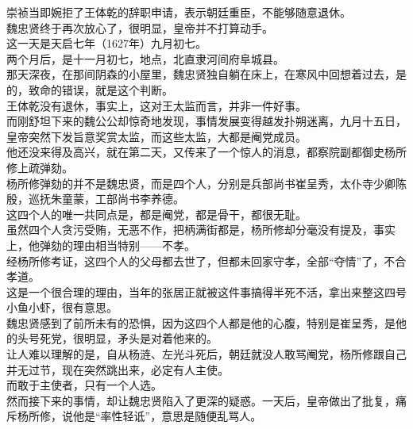 \begin{multicols}{\theparacolNo}
崇祯当即婉拒了王体乾的辞职申请，表示朝廷重臣，不能够随意退休。\\

魏忠贤终于再次放心了，很明显，皇帝并不打算动手。\\

这一天是天启七年（1627年）九月初七。\\

两个月后，是十一月初七，地点，北直隶河间府阜城县。\\

那天深夜，在那间阴森的小屋里，魏忠贤独自躺在床上，在寒风中回想着过去，是的，致命的错误，就是这个判断。\\

王体乾没有退休，事实上，这对王太监而言，并非一件好事。\\

而刚舒坦下来的魏公公却惊奇地发现，事情发展变得越发扑朔迷离，九月十五日，皇帝突然下发旨意奖赏太监，而这些太监，大都是阉党成员。\\

他还没来得及高兴，就在第二天，又传来了一个惊人的消息，都察院副都御史杨所修上疏弹劾。\\

杨所修弹劾的并不是魏忠贤，而是四个人，分别是兵部尚书崔呈秀，太仆寺少卿陈殷，巡抚朱童蒙，工部尚书李养德。\\

这四个人的唯一共同点是，都是阉党，都是骨干，都很无耻。\\

虽然四个人贪污受贿，无恶不作，把柄满街都是，杨所修却分毫没有提及，事实上，他弹劾的理由相当特别——不孝。\\

经杨所修考证，这四个人的父母都去世了，但都未回家守孝，全部“夺情”了，不合孝道。\\

这是一个很合理的理由，当年的张居正就被这件事搞得半死不活，拿出来整这四号小鱼小虾，很有意思。\\

魏忠贤感到了前所未有的恐惧，因为这四个人都是他的心腹，特别是崔呈秀，是他的头号死党，很明显，矛头是对着他来的。\\

让人难以理解的是，自从杨涟、左光斗死后，朝廷就没人敢骂阉党，杨所修跟自己并无过节，现在突然跳出来，必定有人主使。\\

而敢于主使者，只有一个人选。\\

然而接下来的事情，却让魏忠贤陷入了更深的疑惑。一天后，皇帝做出了批复，痛斥杨所修，说他是“率性轻诋”，意思是随便乱骂人。\\


\end{multicols}
